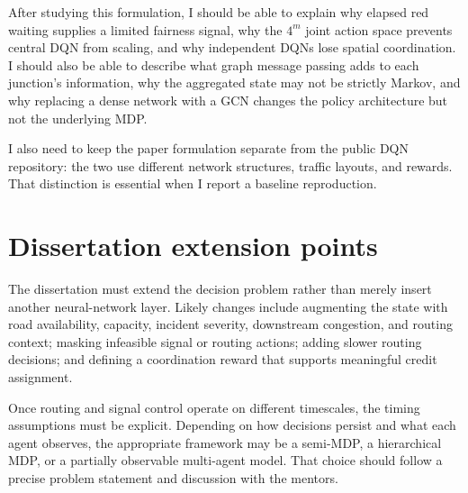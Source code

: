 \documentclass[11pt]{article}
\begin{document}
After studying this formulation, I should be able to explain why elapsed red waiting supplies a limited fairness signal, why the $4^m$ joint action space prevents central DQN from scaling, and why independent DQNs lose spatial coordination. I should also be able to describe what graph message passing adds to each junction's information, why the aggregated state may not be strictly Markov, and why replacing a dense network with a GCN changes the policy architecture but not the underlying MDP.

I also need to keep the paper formulation separate from the public DQN repository: the two use different network structures, traffic layouts, and rewards. That distinction is essential when I report a baseline reproduction.

\section{Dissertation extension points}

The dissertation must extend the decision problem rather than merely insert another neural-network layer. Likely changes include augmenting the state with road availability, capacity, incident severity, downstream congestion, and routing context; masking infeasible signal or routing actions; adding slower routing decisions; and defining a coordination reward that supports meaningful credit assignment.

Once routing and signal control operate on different timescales, the timing assumptions must be explicit. Depending on how decisions persist and what each agent observes, the appropriate framework may be a semi-MDP, a hierarchical MDP, or a partially observable multi-agent model. That choice should follow a precise problem statement and discussion with the mentors.
\end{document}
